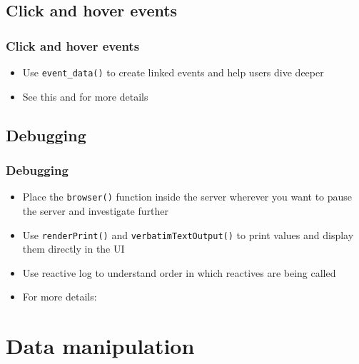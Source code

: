 \documentclass[
	11pt, %
]{beamer}
\begin{document}
\subsection{Click and hover events}

\begin{frame}
	\frametitle{Click and hover events}
	\begin{itemize}
	\item Use \texttt{event\_data()} to create linked events and help users dive deeper
	\item See this \href{https://plotly-r.com/linking-views-with-shiny.html\#shiny-plotly-inputs}{\color{blue}{documentation}} and \href{https://testing-apps.shinyapps.io/plotlyevents/}{\color{blue}{interactive example}} for more details
	\end{itemize}
\end{frame}


\subsection{Debugging}

\begin{frame}
	\frametitle{Debugging}
	
	\begin{itemize}
	\item Place the \texttt{browser()} function inside the server wherever you want to pause the server and investigate further
	\item Use \texttt{renderPrint()} and \texttt{verbatimTextOutput()} to print values and display them directly in the UI
	\item Use reactive log to understand order in which reactives are being called
	\item For more details: \href{https://shiny.posit.co/r/articles/improve/debugging/}{\color{blue}{https://shiny.posit.co/r/articles/improve/debugging/}} 

	\end{itemize}
	
\end{frame}


\section{Data manipulation}
\end{document}
